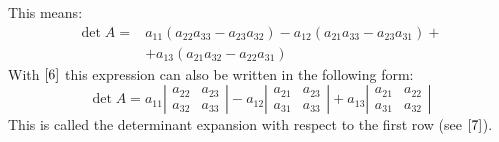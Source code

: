 \documentclass[12pt]{book}
\theoremstyle{definition}\newtheorem{dfn}{Définition}[chapter]
\theoremstyle{plain}\newtheorem{thm}{Théorème}[chapter]
\theoremstyle{plain}\newtheorem{prp}{Proposition}[chapter]
\theoremstyle{plain}\newtheorem{lem}{\bf Lemme}[chapter]
\theoremstyle{plain}\newtheorem{axm}{\bf Axiome}[chapter]
\theoremstyle{plain}\newtheorem{lmm}{\bf Lemme}[chapter]
\theoremstyle{plain}\newtheorem{cor}{\bf Corollaire}[chapter]
\theoremstyle{remark}\newtheorem{rem}{Remarque}[chapter]
\begin{document}
This means:
$$
\begin{aligned}
\operatorname{det} A=& a_{11}\left(a_{22} a_{33}-a_{23} a_{32}\right)-a_{12}\left(a_{21} a_{33}-a_{23} a_{31}\right)+\\
&+a_{13}\left(a_{21} a_{32}-a_{22} a_{31}\right)
\end{aligned}
$$
With $\ref{6}$ this expression can also be written in the following form:
$$
\operatorname{det} A=a_{11}\left|\begin{array}{ll}
a_{22} & a_{23} \\
a_{32} & a_{33}
\end{array}\right|-a_{12}\left|\begin{array}{ll}
a_{21} & a_{23} \\
a_{31} & a_{33}
\end{array}\right|+a_{13}\left|\begin{array}{ll}
a_{21} & a_{22} \\
a_{31} & a_{32}
\end{array}\right|
$$
This is called the determinant expansion with respect to the first row (see $\ref{7}$).
\end{document}
